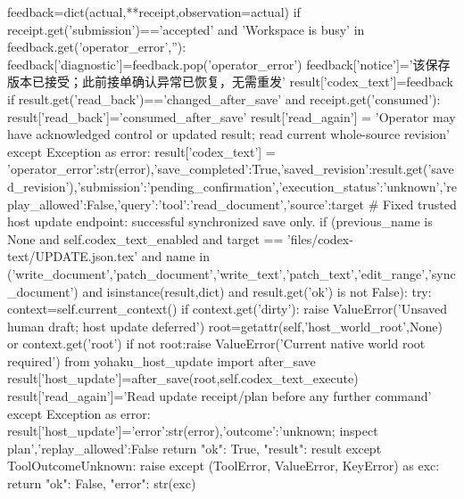                     feedback=dict(actual,**receipt,observation=actual)
                    if receipt.get('submission')=='accepted' and 'Workspace is busy' in feedback.get('operator_error',''):
                        feedback['diagnostic']=feedback.pop('operator_error')
                        feedback['notice']='该保存版本已接受；此前接单确认异常已恢复，无需重发'
                    result['codex_text']=feedback
                    if result.get('read_back')=='changed_after_save' and receipt.get('consumed'):
                        result['read_back']='consumed_after_save'
                    result['read_again'] = 'Operator may have acknowledged control or updated result; read current whole-source revision'
                except Exception as error:
                    result['codex_text'] = {'operator_error':str(error),'save_completed':True,'saved_revision':result.get('saved_revision'),'submission':'pending_confirmation','execution_status':'unknown','replay_allowed':False,'query':{'tool':'read_document','source':target}}
            # Fixed trusted host update endpoint: successful synchronized save only.
            if (previous_name is None and self.codex_text_enabled
                    and target == 'files/codex-text/UPDATE.json.tex'
                    and name in ('write_document','patch_document','write_text','patch_text','edit_range','sync_document')
                    and isinstance(result,dict) and result.get('ok') is not False):
                try:
                    context=self.current_context()
                    if context.get('dirty'):
                        raise ValueError('Unsaved human draft; host update deferred')
                    root=getattr(self,'host_world_root',None) or context.get('root')
                    if not root:raise ValueError('Current native world root required')
                    from yohaku_host_update import after_save
                    result['host_update']=after_save(root,self.codex_text_execute)
                    result['read_again']='Read update receipt/plan before any further command'
                except Exception as error:
                    result['host_update']={'error':str(error),'outcome':'unknown; inspect plan','replay_allowed':False}
            return {"ok": True, "result": result}
        except ToolOutcomeUnknown:
            raise
        except (ToolError, ValueError, KeyError) as exc:
            return {"ok": False, "error": str(exc)}

